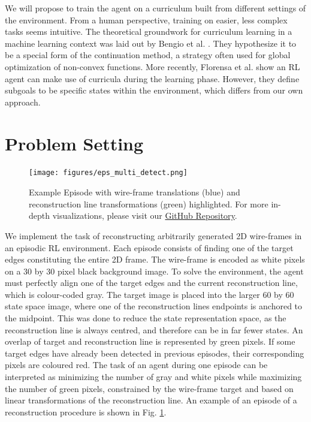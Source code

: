 \documentclass[11pt]{article} %
\begin{document}
We will propose to train the agent on a curriculum built from different settings of the environment. 
From a human perspective, training on easier, less complex tasks seems intuitive. 
The theoretical groundwork for curriculum learning in a machine learning context was laid out by Bengio et al. \cite{bengio-curriculum}. They hypothesize it to be a special form of the continuation method, a strategy often used for global optimization of non-convex functions.
More recently, Florensa et al. \cite{florensa_reverse_2018} show an RL agent can make use of curricula during the learning phase.
However, they define subgoals to be specific states within the environment, which differs from our own approach.
\section{Problem Setting}

\begin{figure}[h!]
    \centering
    \texttt{[image: figures/eps\_multi\_detect.png]}
    
\caption{Example Episode with wire-frame translations (blue) and reconstruction line transformations (green) highlighted. For more in-depth visualizations, please visit our \protect\href{https://github.com/juliantziegler/RL_Wire-Frame_Reconstruction}{GitHub Repository}.}

    \label{fig:fatm_plots}
\end{figure}

We implement the task of reconstructing arbitrarily generated 2D wire-frames in an episodic RL environment.
Each episode consists of finding one of the target edges constituting the entire 2D frame.
The wire-frame is encoded as white pixels on a 30 by 30 pixel black background image. 
To solve the environment, the agent must perfectly align one of the target edges and the current reconstruction line, which is colour-coded gray.
The target image is placed into the larger 60 by 60 state space image, where one of the reconstruction lines endpoints is anchored to the midpoint.
This was done to reduce the state representation space, as the reconstruction line is always centred, and therefore can be in far fewer states.
An overlap of target and reconstruction line is represented by green pixels. If some target edges have already been detected in previous episodes, their corresponding pixels are coloured red. The task of an agent during one episode can be interpreted as minimizing the number of gray and white pixels while maximizing the number of green pixels, constrained by the wire-frame target and based on linear transformations of the reconstruction line. An example of an episode of a reconstruction procedure is shown in Fig. \ref{fig:fatm_plots}.
\end{document}
